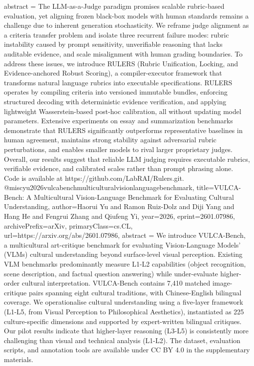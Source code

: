 {      abstract = {The LLM-as-a-Judge paradigm promises scalable rubric-based evaluation, yet aligning frozen black-box models with human standards remains a challenge due to inherent generation stochasticity. We reframe judge alignment as a criteria transfer problem and isolate three recurrent failure modes: rubric instability caused by prompt sensitivity, unverifiable reasoning that lacks auditable evidence, and scale misalignment with human grading boundaries. To address these issues, we introduce RULERS (Rubric Unification, Locking, and Evidence-anchored Robust Scoring), a compiler-executor framework that transforms natural language rubrics into executable specifications. RULERS operates by compiling criteria into versioned immutable bundles, enforcing structured decoding with deterministic evidence verification, and applying lightweight Wasserstein-based post-hoc calibration, all without updating model parameters. Extensive experiments on essay and summarization benchmarks demonstrate that RULERS significantly outperforms representative baselines in human agreement, maintains strong stability against adversarial rubric perturbations, and enables smaller models to rival larger proprietary judges. Overall, our results suggest that reliable LLM judging requires executable rubrics, verifiable evidence, and calibrated scales rather than prompt phrasing alone. Code is available at https://github.com/LabRAI/Rulers.git.}
}@misc{yu2026vulcabenchmulticulturalvisionlanguagebenchmark,
      title={VULCA-Bench: A Multicultural Vision-Language Benchmark for Evaluating Cultural Understanding}, 
      author={Haorui Yu and Ramon Ruiz-Dolz and Diji Yang and Hang He and Fengrui Zhang and Qiufeng Yi},
      year={2026},
      eprint={2601.07986},
      archivePrefix={arXiv},
      primaryClass={cs.CL},
      url={https://arxiv.org/abs/2601.07986},
      abstract = {We introduce VULCA-Bench, a multicultural art-critique benchmark for evaluating Vision-Language Models' (VLMs) cultural understanding beyond surface-level visual perception. Existing VLM benchmarks predominantly measure L1-L2 capabilities (object recognition, scene description, and factual question answering) while under-evaluate higher-order cultural interpretation. VULCA-Bench contains 7,410 matched image-critique pairs spanning eight cultural traditions, with Chinese-English bilingual coverage. We operationalise cultural understanding using a five-layer framework (L1-L5, from Visual Perception to Philosophical Aesthetics), instantiated as 225 culture-specific dimensions and supported by expert-written bilingual critiques. Our pilot results indicate that higher-layer reasoning (L3-L5) is consistently more challenging than visual and technical analysis (L1-L2). The dataset, evaluation scripts, and annotation tools are available under CC BY 4.0 in the supplementary materials.}
}
